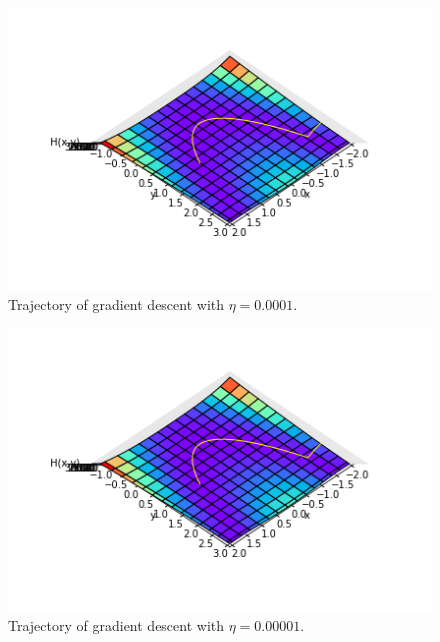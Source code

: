 \documentclass[a4paper,11pt]{article}
\theoremstyle{mytheor}
\begin{document}
\begin{enumerate}
\begin{figure}[h!]
   \centering
   \includegraphics{trajectory00001y267391}\vspace{-0.5cm}
   \caption{\vspace{-0.2cm} Trajectory of gradient descent with $\eta = 0.0001$.}
  \end{figure}\vspace{-0.5cm}
 
\begin{figure}[h!]
   \centering
   \includegraphics{trajectory1e-05y2674138}\vspace{-0.5cm}
   \caption{\vspace{-0.2cm} Trajectory of gradient descent with $\eta = 0.00001$.}
  \end{figure}
\end{enumerate}

\pagebreak
\end{document}
